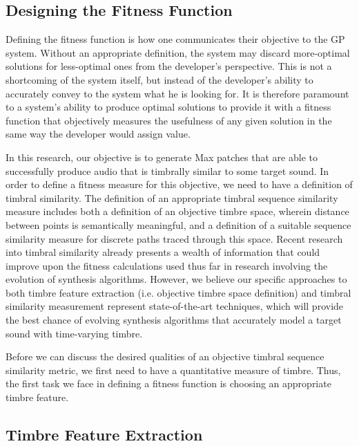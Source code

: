 \documentclass[12pt]{report} 	%
\numberwithin{figure}{chapter}
\numberwithin{table}{chapter}
\numberwithin{equation}{chapter}
\begin{document}
\begin{flushleft}
\vspace{18pt}
\section{Designing the Fitness Function}

Defining the fitness function is how one communicates their objective to the GP system. Without an appropriate definition, the system may discard more-optimal solutions for less-optimal ones from the developer's perspective. This is not a shortcoming of the system itself, but instead of the developer's ability to accurately convey to the system what he is looking for. It is therefore paramount to a system's ability to produce optimal solutions to provide it with a fitness function that objectively measures the usefulness of any given solution in the same way the developer would assign value.

In this research, our objective is to generate Max patches that are able to successfully produce audio that is timbrally similar to some target sound. In order to define a fitness measure for this objective, we need to have a definition of timbral similarity. The definition of an appropriate timbral sequence similarity measure includes both a definition of an objective timbre space, wherein distance between points is semantically meaningful, and a definition of a suitable sequence similarity measure for discrete paths traced through this space. Recent research into timbral similarity already presents a wealth of information that could improve upon the fitness calculations used thus far in research involving the evolution of synthesis algorithms. However, we believe our specific approaches to both timbre feature extraction (i.e. objective timbre space definition) and timbral similarity measurement represent state-of-the-art techniques, which will provide the best chance of evolving synthesis algorithms that accurately model a target sound with time-varying timbre.

Before we can discuss the desired qualities of an objective timbral sequence similarity metric, we first need to have a quantitative measure of timbre. Thus, the first task we face in defining a fitness function is choosing an appropriate timbre feature.

\vspace{12pt}
\subsection{Timbre Feature Extraction}


\end{flushleft}
\end{document}
